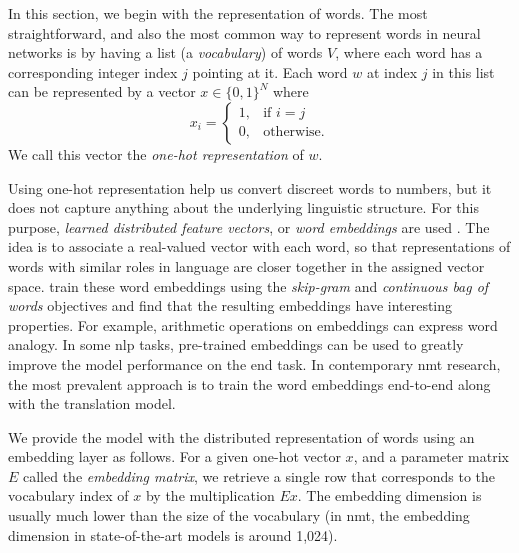 In this section, we begin with the representation of words. The most
straightforward, and also the most common way to represent words in neural
networks is by having a list (a \emph{vocabulary}) of words $V$, where each
word has a corresponding integer index $j$ pointing at it. Each word $w$ at
index $j$ in this list can be represented by a vector
$x \in \{0,1\}^N$ where
%
\begin{equation} x_i =
\begin{cases} 1, & \text{if } i = j \\ 0, & \text{otherwise.}
\end{cases}
\end{equation}
%
We call this vector the \emph{one-hot representation} of $w$.

Using one-hot representation help us convert discreet words to numbers, but it
does not capture anything about the underlying linguistic structure.  For this
purpose, \emph{learned distributed feature vectors}, or \emph{word embeddings}
are used \citep{bengio2003neural} . The idea is to
associate a real-valued vector with each word, so that representations of words
with similar roles in language are closer together in the assigned vector
space. \citet{mikolov2013distributed} train these word embeddings using the
\emph{skip-gram} and \emph{continuous bag of words} objectives and find that
the resulting embeddings have interesting properties. For example, arithmetic
operations on embeddings can express word analogy.  In some \gls{nlp} tasks,
pre-trained embeddings can be used to greatly improve the model performance on
the end task. In contemporary \gls{nmt} research, the most prevalent approach
is to train the word embeddings end-to-end along with the translation model.

We provide the model with the distributed representation of words using an
embedding layer as follows. For a given one-hot vector $x$, and a
parameter matrix $E$ called the \emph{embedding matrix}, we retrieve a single
row that corresponds to the vocabulary index of $x$ by the
multiplication $E x$.
The embedding dimension is usually much lower than the size of the vocabulary
(in \gls{nmt}, the embedding dimension in state-of-the-art models is around
1,024).

